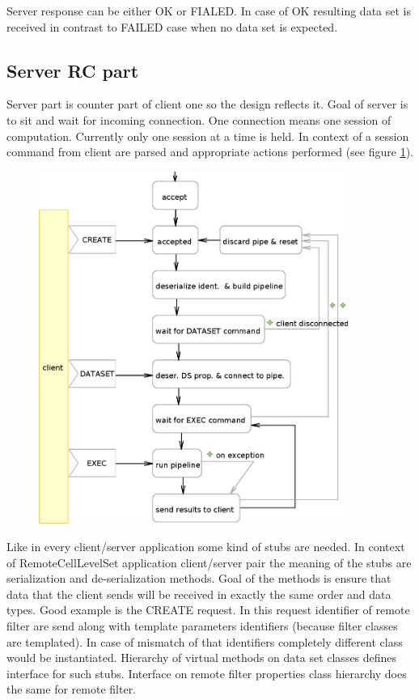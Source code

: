 Server response can be either OK or FIALED.
In case of OK resulting data set is received in contrast to FAILED case when no data set is expected.

\subsection{Server RC part}

Server part is counter part of client one so the design reflects it.
Goal of server is to sit and wait for incoming connection.
One connection means one session of computation.
Currently only one session at a time is held.
In context of a session command from client are parsed and appropriate actions performed (see figure \ref{fg:RCServerCycle}).

\begin{figure}
    \centering
    \includegraphics[width=0.9\textwidth]{data/RCServerCycle}
    \caption[MedV4D server cycle]{}
    \label{fg:RCServerCycle}
\end{figure}

Like in every client/server application some kind of stubs are needed.
In context of RemoteCellLevelSet application client/server pair the meaning of the stubs are serialization and de-serialization methods.
Goal of the methods is ensure that data that the client sends will be received in exactly the same order and data types.
Good example is the CREATE request.
In this request identifier of remote filter are send along with template parameters identifiers (because filter classes are templated).
In case of mismatch of that identifiers completely different class would be instantiated.
Hierarchy of virtual methods on data set classes defines interface for such stubs.
Interface on remote filter properties class hierarchy does the same for remote filter.

